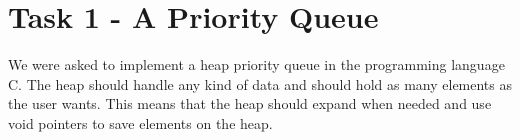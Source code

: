 \documentclass[11pt]{article}
\begin{document}

    \clearpage
    \maketitle
    \thispagestyle{empty}

    \newpage




\section*{Task 1 - A Priority Queue}
We were asked to implement a heap priority queue in the programming language C.
The heap should handle any kind of data and should hold as many elements as the
user wants.  This means that the heap should expand when needed and use void
pointers to save elements on the heap.
\end{document}

